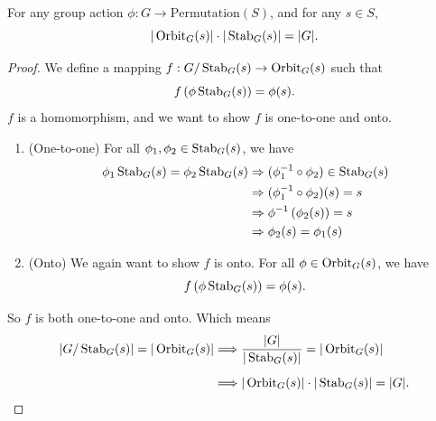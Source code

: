 \begin{theorem}
    For any group action $\phi : G \to \text{Permutation}(S)$, and for any $s \in S$,
    \begin{equation}
        |\operatorname{Orbit}_G(s)| \cdot |\operatorname{Stab}_G(s)| = |G|.
    \end{equation}
\end{theorem}
\begin{proof}
    We define a mapping $f: G/\operatorname{Stab}_G(s) \to \operatorname{Orbit}_G(s)$ such that 
    \[
        f\left( \phi \operatorname{Stab}_G(s) \right) = \phi(s).
    \]
    $f$ is a homomorphism, and we want to show $f$ is one-to-one and onto. 
    \begin{enumerate}
        \item (One-to-one) For all $\phi_1, \phi_2 \in \operatorname{Stab}_G(s)$, we have
        \begin{align*}
            \phi_1 \operatorname{Stab}_G(s) = \phi_2 \operatorname{Stab}_G(s) &\Rightarrow (\phi_1^{-1} \circ \phi_2) \in \operatorname{Stab}_G(s)\\
            &\Rightarrow (\phi_1^{-1} \circ \phi_2)(s) = s\\
            &\Rightarrow \phi^{-1} \left( \phi_2(s) \right) = s\\
            &\Rightarrow \phi_2(s) = \phi_1(s)\\
        \end{align*}

        \item (Onto) We again want to show $f$ is onto. For all $\phi \in \operatorname{Orbit}_G(s)$, we have
        \[
            f\left( \phi \operatorname{Stab}_G(s) \right) = \phi(s).
        \]
    \end{enumerate}
    So $f$ is both one-to-one and onto. Which means 
    \begin{align*}
        |G/\operatorname{Stab}_G(s)| = |\operatorname{Orbit}_G(s)| &\Longrightarrow \frac{|G|}{|\operatorname{Stab}_G(s)|} = |\operatorname{Orbit}_G(s)|\\[0.5em]
        &\Longrightarrow |\operatorname{Orbit}_G(s)| \cdot |\operatorname{Stab}_G(s)| = |G|.
    \end{align*}
\end{proof}

